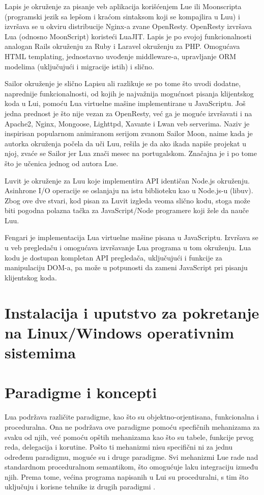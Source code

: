 \documentclass[a4paper]{article}
\begin{document}
Lapis je okruženje za pisanje veb aplikacija korišćenjem Lue ili Moonscripta (programski jezik sa lepšom i kraćom sintaksom koji se kompajlira u Luu) i izvršava se u okviru distribucije Nginx-a zvane OpenResty. OpenResty izvršava Lua (odnosno MoonScript) koristeći LuaJIT. Lapis je po svojoj funkcionalnosti analogan Rails okruženju za Ruby i Laravel okruženju za PHP. Omogućava HTML templating, jednostavno uvođenje middleware-a, upravljanje ORM modelima (uključujući i migracije istih) i slično. 

Sailor okruženje je slično Lapisu ali razlikuje se po tome što uvodi dodatne, naprednije funkcionalnosti, od kojih je najvažnija mogućnost pisanja klijentskog koda u Lui, pomoću Lua virtuelne mašine implementirane u JavaScriptu. Još jedna prednost je što nije vezan za OpenResty, već ga je moguće izvršavati i na Apache2, Nginx, Mongoose, Lighttpd, Xavante i Lwan veb serverima. Naziv je inspirisan popularnom animiranom serijom zvanom Sailor Moon, naime kada je autorka okruženja počela da uči Luu, rešila je da ako ikada napiše projekat u njoj, zvaće se Sailor jer Lua znači mesec na portugalskom. Značajna je i po tome što je učenica jednog od autora Lue\cite{frameworkSailor}.

Luvit je okruženje za Luu koje implementira API identičan Node.js okruženju. Asinhrone I/O operacije se oslanjaju na istu biblioteku kao u Node.js-u (libuv). Zbog ove dve stvari, kod pisan za Luvit izgleda veoma slično kodu, stoga može biti pogodna polazna tačka za JavaScript/Node programere koji žele da nauče Luu.

Fengari je implementacija Lua virtuelne mašine pisana u JavaScriptu. Izvršava se u veb pregledaču i omogućava izvršavanje Lua programa u tom okruženju. Lua kodu je dostupan kompletan API pregledača, uključujući i funkcije za manipulaciju DOM-a, pa može u potpunosti da zameni JavaScript pri pisanju klijentskog koda\cite{frameworkFengari}.


\section{Instalacija i uputstvo za pokretanje na Linux/Windows operativnim sistemima}
\label{sec:instalacija}


\section{Paradigme i koncepti}
\label{sec:paradigme_koncepti}

Lua podržava različite paradigme, kao što su objektno-orjentisana, funkcionalna i proceduralna. Ona ne podržava ove paradigme pomoću specfičnih mehanizama za svaku od njih, već pomoću opštih mehanizama kao što su tabele, funkcije prvog reda, delegacija i korutine. Pošto ti mehanizmi nisu specifični ni za jednu određenu paradigmu, moguće su i druge paradigme. Svi mehanizmi Lue rade nad standardnom proceduralnom semantikom, što omogućuje laku integraciju između njih. Prema tome, većina programa napisanih u Lui su proceduralni, s tim što uključuju i korisne tehnike iz drugih paradigmi \cite{multiParadigms}.
\end{document}
